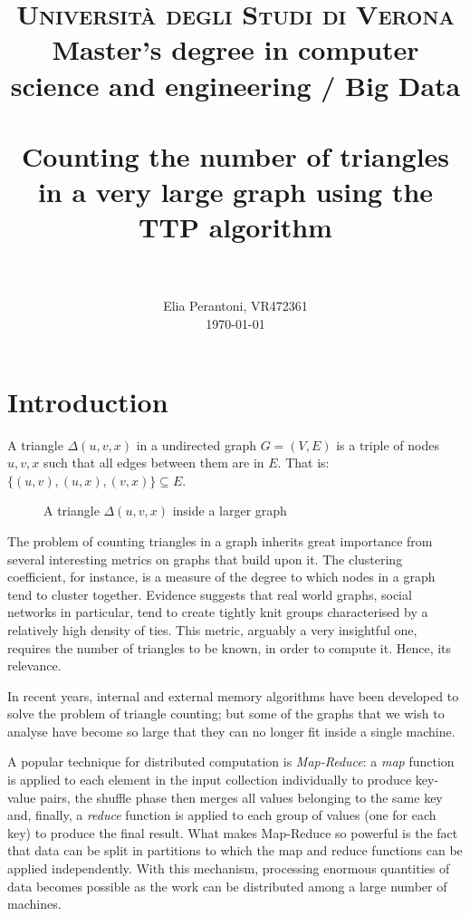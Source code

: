 \documentclass[paper=a4, fontsize=11pt]{scrartcl}
\title{
    \usefont{OT1}{bch}{b}{n}
    \normalfont \normalsize \textsc{Università degli Studi di Verona} \\ [15pt]
    Master's degree in computer science and engineering / Big Data \\ [15pt]
    \horrule{0.5pt} \\[0.4cm]
    \huge Counting the number of triangles in a very large graph using the TTP algorithm \\
    \horrule{2pt} \\[0.5cm]
}
\author{
    \normalfont \normalsize
    Elia Perantoni, VR472361
    \\[-3pt] \normalsize \today
}
\date{}
\numberwithin{equation}{section}
\numberwithin{figure}{section}
\numberwithin{table}{section}
\begin{document}
\maketitle
\section{Introduction}
A triangle $\Delta(u, v, x)$ in a undirected graph $G=(V, E)$ is a triple of
nodes $u, v, x$ such that all edges between them are in $E$. That is: $\{(u,v),
(u,x), (v, x)\}\subseteq E$.

\begin{figure}[htb]
    \centering
    \caption{A triangle $\Delta(u, v, x)$ inside a larger graph}
\end{figure}

The problem of counting triangles in a graph inherits great importance from
several interesting metrics on graphs that build upon it. The clustering
coefficient, for instance, is a measure of the degree to which nodes in a graph
tend to cluster together. Evidence suggests that real world graphs, social
networks in particular, tend to create tightly knit groups characterised by a
relatively high density of ties. This metric, arguably a very insightful one,
requires the number of triangles to be known, in order to compute it. Hence, its
relevance.

In recent years, internal and external memory algorithms have been developed to
solve the problem of triangle counting; but some of the graphs that we wish to
analyse have become so large that they can no longer fit inside a single
machine.

A popular technique for distributed computation is \emph{Map-Reduce}: a
\emph{map} function is applied to each element in the input collection
individually to produce key-value pairs, the shuffle phase then merges all
values belonging to the same key and, finally, a \emph{reduce} function is
applied to each group of values (one for each key) to produce the final result.
What makes Map-Reduce so powerful is the fact that data can be split in
partitions to which the map and reduce functions can be applied independently.
With this mechanism, processing enormous quantities of data becomes possible as
the work can be distributed among a large number of machines.
\end{document}
